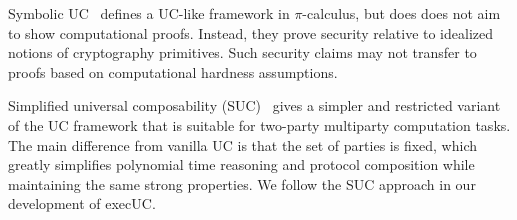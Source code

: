 Symbolic UC~\cite{bohl2016symbolic} defines a UC-like framework
in $\pi$-calculus, but does does not aim to show computational
proofs. Instead, they prove security relative to idealized notions
of cryptography primitives. Such security claims may not transfer
to proofs based on computational hardness assumptions.

Simplified universal composability (SUC)~\cite{canetti2015simpler} gives a
simpler and restricted variant of the UC framework that is suitable for
two-party multiparty computation tasks. The main difference from vanilla UC is
that the set of parties is fixed, which greatly simplifies polynomial time
reasoning and protocol composition while maintaining the same strong properties.
We follow the SUC approach in our development of \textsf{execUC}.

\begin{comment}
\begin{enumerate}[leftmargin=*]
  \item Symbolic UC~\cite{bohl2016symbolic} transports ideas from the UC
    framework to the symbolic model of cryptography, in which cryptographic
    operations are abstracted as a term process algebra (specifically, a variant
    of the applied $\pi$-calculus) and adversary capabilities are defined by
    deduction rules over these terms. In particular, they show that certain
    aspects of the UC framework, such as ideal functionality specifications and
    UC composition, still carry over to the symbolic model. They are also able
    to show that certain results, such as the impossibility of UC commitments in
    the standard model of cryptography, can still be observed in the symbolic
    model. Although this abstract vantage point leads to simpler security proofs
    that can be amenable to automated reasoning, security guarantees derived
    from symbolic analyses are not as strong as those from computational
    analyses considered in UC and in cryptography more broadly.
  \item RSIM~\cite{backes2007reactive}.
  \item CertiCrypt~\cite{barthe2009formal} is a framework (built on
    Coq~\cite{barras1997coq}) that supports machine-checked game-based proofs of
    security. It includes tools to reason about the equivalence of probabilistic
    programs, a relational Hoare logic, a theory of observational equivalence,
    verified program transformations, and game-based techniques.  Their
    experience shows that the type system and automated tactics provide valuable
    information in debugging proofs.

\end{comment}
